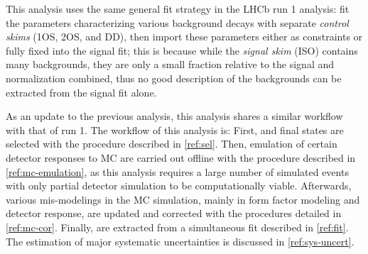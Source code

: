 
This analysis uses the same general fit strategy in the LHCb \RDX run 1
analysis:
fit the parameters characterizing various background decays with separate
\emph{control skims} (1OS, 2OS, and DD),
then import these parameters either as constraints or fully fixed into the
signal fit;
this is because while the \emph{signal skim} (ISO) contains many
backgrounds,
they are only a small fraction relative to the signal and normalization
combined,
thus no good description of the backgrounds can be extracted from the signal fit
alone.


As an update to the previous analysis, this analysis shares a similar
workflow with that of run 1.
The workflow of this analysis is:
First, \Dstarp\mun and \Dz\mun final states are selected with the procedure
described in \cref{ref:sel}.
Then, emulation of certain detector responses to MC are carried out offline
with the procedure described in
\cref{ref:mc-emulation},
as this analysis requires a large number of simulated events with only partial
detector simulation to be computationally viable.
Afterwards, various mis-modelings in the MC simulation,
mainly in form factor modeling and detector response, are updated and
corrected with the procedures detailed in \cref{ref:mc-cor}.
Finally, \RDX are extracted from a simultaneous fit described in \cref{ref:fit}.
The estimation of major systematic uncertainties is discussed in
\cref{ref:sys-uncert}.


